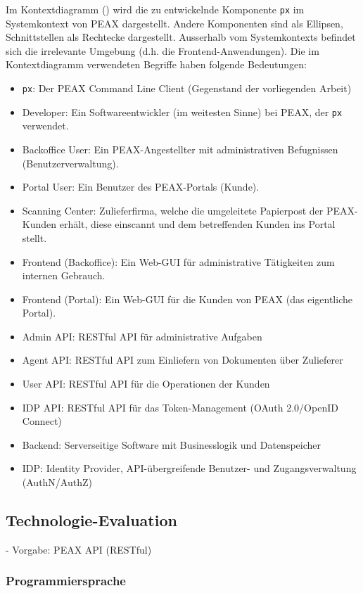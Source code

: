 Im Kontextdiagramm () wird die zu entwickelnde Komponente \texttt{px} im Systemkontext von PEAX dargestellt. Andere Komponenten sind als Ellipsen, Schnittstellen als Rechtecke dargestellt. Ausserhalb vom Systemkontexts befindet sich die irrelevante Umgebung (d.h. die Frontend-Anwendungen). Die im Kontextdiagramm verwendeten Begriffe haben folgende Bedeutungen:

\begin{itemize}
	\item \texttt{px}: Der PEAX Command Line Client (Gegenstand der vorliegenden Arbeit)
	\item Developer: Ein Softwareentwickler (im weitesten Sinne) bei PEAX, der \texttt{px} verwendet.
	\item Backoffice User: Ein PEAX-Angestellter mit administrativen Befugnissen (Benutzerverwaltung).
	\item Portal User: Ein Benutzer des PEAX-Portals (Kunde).
	\item Scanning Center: Zulieferfirma, welche die umgeleitete Papierpost der PEAX-Kunden erhält, diese einscannt und dem betreffenden Kunden ins Portal stellt.
	\item Frontend (Backoffice): Ein Web-GUI für administrative Tätigkeiten zum internen Gebrauch.
	\item Frontend (Portal): Ein Web-GUI für die Kunden von PEAX (das eigentliche Portal).
	\item Admin API: RESTful API für administrative Aufgaben
	\item Agent API: RESTful API zum Einliefern von Dokumenten über Zulieferer
	\item User API: RESTful API für die Operationen der Kunden
	\item IDP API: RESTful API für das Token-Management (OAuth 2.0/OpenID Connect)
	\item Backend: Serverseitige Software mit Businesslogik und Datenspeicher
	\item IDP: Identity Provider, API-übergreifende Benutzer- und Zugangsverwaltung (AuthN/AuthZ)
\end{itemize}

\subsection{Technologie-Evaluation}

- Vorgabe: PEAX API (RESTful)

\subsubsection{Programmiersprache}

